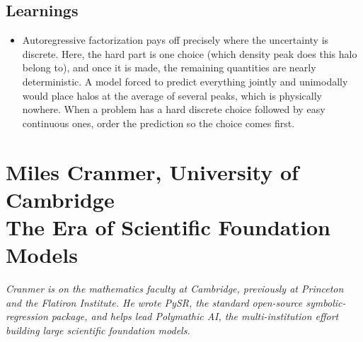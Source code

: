 \documentclass[11pt]{article}
\begin{document}
\subsection*{Learnings}
\begin{itemize}
    \item Autoregressive factorization pays off precisely where the uncertainty is discrete. Here, the hard part is one choice (which density peak does this halo belong to), and once it is made, the remaining quantities are nearly deterministic. A model forced to predict everything jointly and unimodally would place halos at the average of several peaks, which is physically nowhere. When a problem has a hard discrete choice followed by easy continuous ones, order the prediction so the choice comes first.
\end{itemize}

\section{Miles Cranmer, University of Cambridge\\
{\large The Era of Scientific Foundation Models}}

\emph{Cranmer is on the mathematics faculty at Cambridge, previously at Princeton and the Flatiron Institute. He wrote PySR, the standard open-source symbolic-regression package, and helps lead Polymathic AI, the multi-institution effort building large scientific foundation models.}
\end{document}

